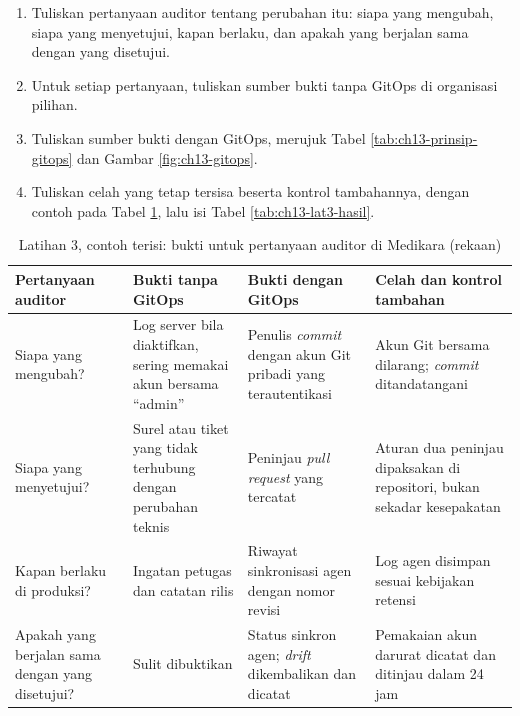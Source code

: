 \begin{enumerate}
  \item Tuliskan pertanyaan auditor tentang perubahan itu: siapa yang mengubah, siapa yang
        menyetujui, kapan berlaku, dan apakah yang berjalan sama dengan yang disetujui.
  \item Untuk setiap pertanyaan, tuliskan sumber bukti tanpa GitOps di organisasi pilihan.
  \item Tuliskan sumber bukti dengan GitOps, merujuk Tabel \ref{tab:ch13-prinsip-gitops} dan
        Gambar \ref{fig:ch13-gitops}.
  \item Tuliskan celah yang tetap tersisa beserta kontrol tambahannya, dengan contoh pada Tabel
        \ref{tab:ch13-lat3-contoh}, lalu isi Tabel \ref{tab:ch13-lat3-hasil}.
\end{enumerate}

\begin{table}[!htb]
  \centering
  \caption{Latihan 3, contoh terisi: bukti untuk pertanyaan auditor di Medikara (rekaan)}
  \label{tab:ch13-lat3-contoh}
  \footnotesize
  \begin{tabularx}{\textwidth}{>{\raggedright\arraybackslash}p{2.4cm} >{\raggedright\arraybackslash}X >{\raggedright\arraybackslash}X >{\raggedright\arraybackslash}X}
    \hline
    \textbf{Pertanyaan auditor} & \textbf{Bukti tanpa GitOps} & \textbf{Bukti dengan GitOps} &
      \textbf{Celah dan kontrol tambahan} \\ \hline
    Siapa yang mengubah? & Log server bila diaktifkan, sering memakai akun bersama
      ``admin'' & Penulis \textit{commit} dengan akun Git pribadi yang terautentikasi & Akun Git
      bersama dilarang; \textit{commit} ditandatangani \\ \hline
    Siapa yang menyetujui? & Surel atau tiket yang tidak terhubung dengan perubahan teknis &
      Peninjau \textit{pull request} yang tercatat & Aturan dua peninjau dipaksakan di
      repositori, bukan sekadar kesepakatan \\ \hline
    Kapan berlaku di produksi? & Ingatan petugas dan catatan rilis & Riwayat sinkronisasi agen
      dengan nomor revisi & Log agen disimpan sesuai kebijakan retensi \\ \hline
    Apakah yang berjalan sama dengan yang disetujui? & Sulit dibuktikan & Status sinkron agen;
      \textit{drift} dikembalikan dan dicatat & Pemakaian akun darurat dicatat dan ditinjau
      dalam 24 jam \\ \hline
  \end{tabularx}
\end{table}

